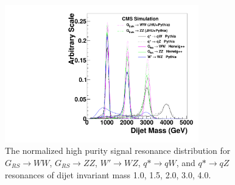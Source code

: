 \begin{figure}[htb]
\begin{center}
\includegraphics[width=0.75\textwidth]{EXO-12-024/figs/signal-acc-eff/resonance-shape.pdf}
\end{center}
\caption{The normalized high purity signal resonance distribution for  $G_{RS}\to WW$, $G_{RS}\to ZZ$, $W' \to WZ$, $q*\to qW$, and $q*\to qZ$ resonances of dijet invariant mass 1.0\TeVcc, 1.5\TeVcc, 2.0\TeVcc,  3.0\TeVcc, 4.0\TeVcc.
}
\label{fig:highsignalShapes}
\end{figure}







